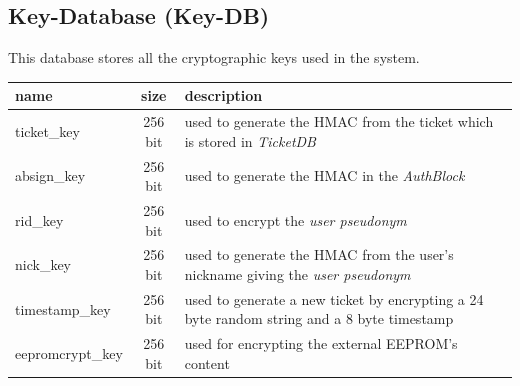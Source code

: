 \subsection{Key-Database (Key-DB)}
This database stores all the cryptographic keys used in the system.\\
\begin{tabular}{|l|c|p{8cm}|} \hline
name & size & description \\ \hline 
ticket\_key            & 256 bit & used to generate the HMAC from the ticket which is stored in \textit{TicketDB} \\
absign\_key      & 256 bit & used to generate the HMAC in the \textit{AuthBlock} \\
rid\_key         & 256 bit & used to encrypt the \textit{user pseudonym} \\
nick\_key        & 256 bit & used to generate the HMAC from the user's nickname giving the \textit{user pseudonym} \\
timestamp\_key   & 256 bit & used to generate a new ticket by encrypting a 24 byte random string and a 8 byte timestamp \\
eepromcrypt\_key & 256 bit & used for encrypting the external EEPROM's content \\
\hline
\end{tabular}

